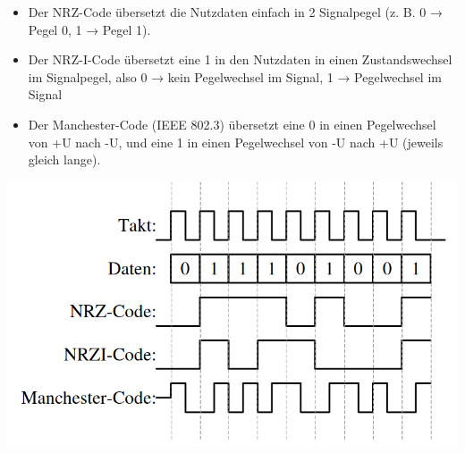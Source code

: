 
\begin{itemize}
    \item Der NRZ-Code übersetzt die Nutzdaten einfach in 2 Signalpegel (z. B. 0 → Pegel 0, 1 → Pegel 1).
    \item Der NRZ-I-Code übersetzt eine 1 in den Nutzdaten in einen Zustandswechsel im Signalpegel, also
    0 → kein Pegelwechsel im Signal, 1 → Pegelwechsel im Signal
    \item Der Manchester-Code (IEEE 802.3) übersetzt eine 0 in einen Pegelwechsel von +U nach -U, und
    eine 1 in einen Pegelwechsel von -U nach +U (jeweils gleich lange).
\end{itemize}

\includegraphics[width=\textwidth]{img/vorlesung12_uebungsaufgabe1_loesung}
